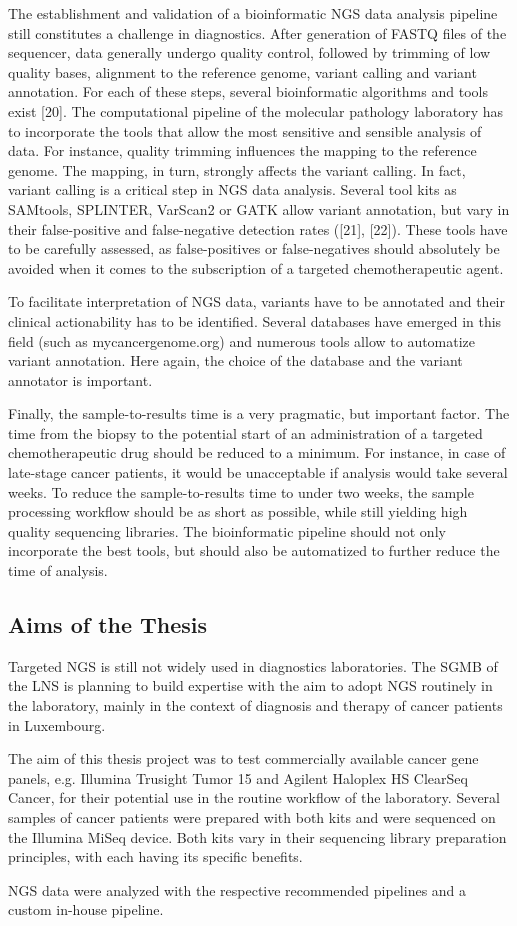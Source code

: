 The establishment and validation of a bioinformatic NGS data analysis pipeline
still constitutes a challenge in diagnostics. After generation of FASTQ files of
the sequencer, data generally undergo quality control, followed by trimming of
low quality bases, alignment to the reference genome, variant calling and
variant annotation. For each of these steps, several bioinformatic algorithms
and tools exist [20]. The computational pipeline of the molecular pathology
laboratory has to incorporate the tools that allow the most sensitive and
sensible analysis of data. For instance, quality trimming influences the mapping
to the reference genome. The mapping, in turn, strongly affects the variant
calling. In fact, variant calling is a critical step in NGS data analysis.
Several tool kits as SAMtools, SPLINTER, VarScan2 or GATK allow variant
annotation, but vary in their false-positive and false-negative detection rates
([21], [22]). These tools have to be carefully assessed, as false-positives or
false-negatives should absolutely be avoided when it comes to the subscription
of a targeted chemotherapeutic agent.

To facilitate interpretation of NGS data, variants have to be annotated and
their clinical actionability has to be identified. Several databases have
emerged in this field (such as mycancergenome.org) and numerous tools allow to
automatize variant annotation. Here again, the choice of the database and the
variant annotator is important.

Finally, the sample-to-results time is a very pragmatic, but important factor.
The time from the biopsy to the potential start of an administration of a
targeted chemotherapeutic drug should be reduced to a minimum. For instance, in
case of late-stage cancer patients, it would be unacceptable if analysis would
take several weeks. To reduce the sample-to-results time to under two weeks, the
sample processing workflow should be as short as possible, while still yielding
high quality sequencing libraries. The bioinformatic pipeline should not only
incorporate the best tools, but should also be automatized to further reduce the
time of analysis.

\subsection{Aims of the Thesis}
Targeted NGS is still not widely used in diagnostics laboratories. The SGMB of the LNS
is planning to build expertise with the aim to adopt NGS routinely in the laboratory,
mainly in the context of diagnosis and therapy of cancer patients in Luxembourg.

The aim of this thesis project was to test commercially available cancer gene panels,
e.g. Illumina Trusight Tumor 15 and Agilent Haloplex HS ClearSeq Cancer, for their
potential use in the routine workflow of the laboratory. Several samples of cancer
patients were prepared with both kits and were sequenced on the Illumina MiSeq device.
Both kits vary in their sequencing library preparation principles, with each having
its specific benefits.

NGS data were analyzed with the respective recommended pipelines and a custom in-house
pipeline.
